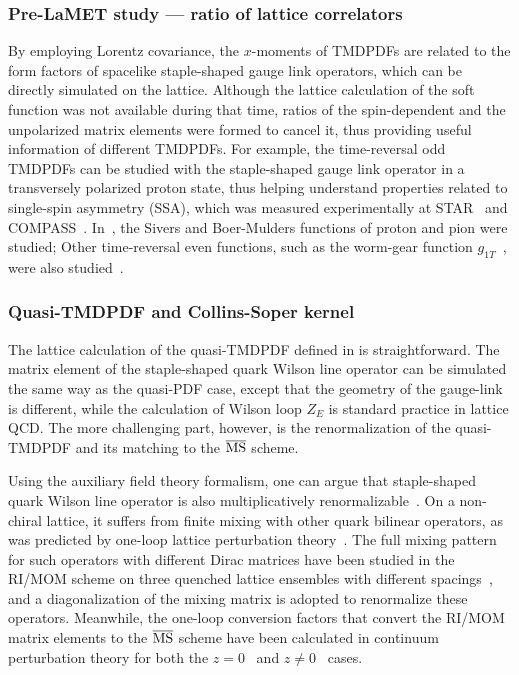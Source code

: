 \subsubsection{Pre-LaMET study --- ratio of lattice correlators}

By employing Lorentz covariance, the $x$-moments of TMDPDFs are related to the form factors of spacelike staple-shaped gauge link operators, which can be directly simulated on the lattice. Although the lattice calculation of the soft function was not available during that time, ratios of the spin-dependent and the unpolarized matrix elements were formed to cancel it, thus providing useful information of different TMDPDFs.
For example, the time-reversal odd TMDPDFs can be studied with the staple-shaped gauge link operator in a transversely polarized proton state, thus helping understand properties related to single-spin asymmetry (SSA), which was measured experimentally at STAR~\cite{Adamczyk:2015gyk}
and COMPASS~\cite{Aghasyan:2017jop}.
%
In~\cite{Musch:2011er,Engelhardt:2015xja}, the Sivers and Boer-Mulders functions of proton and pion were studied; Other time-reversal even functions, such as the worm-gear function $g_{1T}$~\cite{Tangerman:1994eh}, were also studied~\cite{Yoon:2017qzo}.

\subsubsection{Quasi-TMDPDF and Collins-Soper kernel}

The lattice calculation of the quasi-TMDPDF defined in  is straightforward.
The matrix element of the staple-shaped quark Wilson line operator can be simulated the same way as the quasi-PDF case, except that the geometry of the gauge-link is different, while the calculation of Wilson loop $Z_E$ is standard practice in lattice QCD. The more challenging part, however, is the renormalization of the quasi-TMDPDF and its matching to the $\overline{\rm MS}$ scheme.

Using the auxiliary field theory formalism, one can argue that staple-shaped quark Wilson line operator is also multiplicatively renormalizable~\cite{Ebert:2019tvc,Green:2020xco}. On a non-chiral lattice, it suffers from finite mixing with other quark bilinear operators, as was predicted by one-loop lattice perturbation theory~\cite{Constantinou:2019vyb}. The full mixing pattern for such operators with different Dirac matrices have been studied in the RI/MOM scheme on three quenched lattice ensembles with different spacings~\cite{Shanahan:2019zcq}, and a diagonalization of the mixing matrix is adopted to renormalize these operators. Meanwhile, the one-loop conversion factors that convert the RI/MOM matrix elements to the $\overline{\rm MS}$ scheme have been calculated in continuum perturbation theory for both the $z=0$~\cite{Constantinou:2019vyb} and $z\neq0$~\cite{Ebert:2019tvc} cases.

